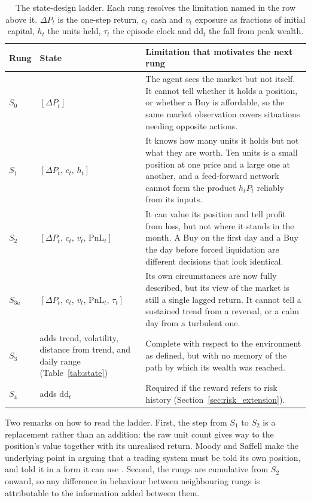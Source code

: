 \begin{table}[h]
\centering
\caption{The state-design ladder. Each rung resolves the limitation named
in the row above it. $\Delta P_t$ is the one-step return, $c_t$ cash and
$v_t$ exposure as fractions of initial capital, $h_t$ the units held,
$\tau_t$ the episode clock and $\mathrm{dd}_t$ the fall from peak wealth.}
\label{tab:state_ladder}
\small
\begin{tabular}{p{1.1cm}p{4.6cm}p{6.2cm}}
\toprule
\textbf{Rung} & \textbf{State} & \textbf{Limitation that motivates the next rung} \\
\midrule
$S_0$
  & $[\Delta P_t]$
  & The agent sees the market but not itself. It cannot tell whether it
    holds a position, or whether a Buy is affordable, so the same market
    observation covers situations needing opposite actions. \\
\addlinespace
$S_1$
  & $[\Delta P_t,\, c_t,\, h_t]$
  & It knows how many units it holds but not what they are worth. Ten
    units is a small position at one price and a large one at another,
    and a feed-forward network cannot form the product $h_t P_t$
    reliably from its inputs. \\
\addlinespace
$S_2$
  & $[\Delta P_t,\, c_t,\, v_t,\, \mathrm{PnL}_t]$
  & It can value its position and tell profit from loss, but not where it
    stands in the month. A Buy on the first day and a Buy the day before
    forced liquidation are different decisions that look identical. \\
\addlinespace
$S_{3a}$
  & $[\Delta P_t,\, c_t,\, v_t,\, \mathrm{PnL}_t,\, \tau_t]$
  & Its own circumstances are now fully described, but its view of the
    market is still a single lagged return. It cannot tell a sustained
    trend from a reversal, or a calm day from a turbulent one. \\
\addlinespace
$S_3$
  & adds trend, volatility, distance from trend, and daily range
    (Table~\ref{tab:state})
  & Complete with respect to the environment as defined, but with no
    memory of the path by which its wealth was reached. \\
\addlinespace
$S_4$
  & adds $\mathrm{dd}_t$
  & Required if the reward refers to risk history
    (Section~\ref{sec:risk_extension}). \\
\bottomrule
\end{tabular}
\end{table}

Two remarks on how to read the ladder. First, the step from $S_1$ to
$S_2$ is a replacement rather than an addition: the raw unit count gives
way to the position's value together with its unrealised return. Moody
and Saffell make the underlying point in arguing that a trading system
must be told its own position, and told it in a form it can use
\cite{moody2001}. Second, the rungs are cumulative from $S_2$ onward, so
any difference in behaviour between neighbouring rungs is attributable to
the information added between them.

